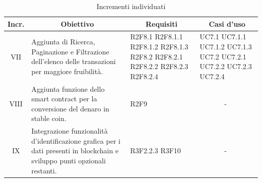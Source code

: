 \begin{table}[H]
  \centering
  \renewcommand{\arraystretch}{1.8}
  \begin{tabular}{c|p{6cm}|p{2cm}|p{2cm}}
    \rowcolor[HTML]{125E28}
    \color[HTML]{FFFFFF}\textbf{Incr.}
    & \multicolumn{1}{c}{\color[HTML]{FFFFFF}\textbf{Obiettivo}}
    & \multicolumn{1}{c}{\color[HTML]{FFFFFF}\textbf{Requisiti}}
    & \multicolumn{1}{c}{\color[HTML]{FFFFFF}\textbf{Casi d'uso}}\\
    \hline
    VII	& Aggiunta di Ricerca, Paginazione e Filtrazione dell'elenco delle transazioni per maggiore fruibilità. & R2F8.1 R2F8.1.1 R2F8.1.2 R2F8.1.3 R2F8.2 R2F8.2.1 R2F8.2.2 R2F8.2.3 R2F8.2.4 & UC7.1 UC7.1.1 UC7.1.2 UC7.1.3 UC7.2 UC7.2.1 UC7.2.2 UC7.2.3 UC7.2.4 \\
    VIII & Aggiunta funzione dello smart contract per la conversione del denaro in stable coin. & R2F9 & \ \ \ \ \ \ \ - \\
    IX & Integrazione funzionalità d'identificazione grafica per i dati presenti in blockchain e sviluppo punti opzionali restanti. & R3F2.2.3 R3F10  & \ \ \ \ \ \ \ - \\
  \end{tabular}
  \caption{Incrementi individuati}
\end{table}
